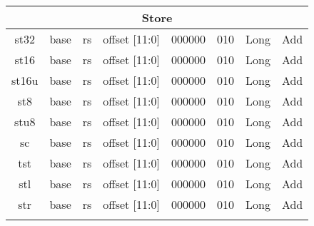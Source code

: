 \documentclass{article}
\begin{document}
\begin{center}
\begin{longtable}{|c|l|r|l|r|l|r|l|r|l|r|c|c|}
                        \multicolumn{13}{|c|}{Store} \\
    \hline st32     &   \multicolumn{2}{|c|}{base}  &   \multicolumn{2}{|c|}{rs}    &   \multicolumn{2}{|c|}{offset [11:0]} &   \multicolumn{2}{|c|}{000000}    &   \multicolumn{2}{|c|}{010}   &   Long    &   Add \\
    \hline st16     &   \multicolumn{2}{|c|}{base}  &   \multicolumn{2}{|c|}{rs}    &   \multicolumn{2}{|c|}{offset [11:0]} &   \multicolumn{2}{|c|}{000000}    &   \multicolumn{2}{|c|}{010}   &   Long    &   Add \\
    \hline st16u    &   \multicolumn{2}{|c|}{base}  &   \multicolumn{2}{|c|}{rs}    &   \multicolumn{2}{|c|}{offset [11:0]} &   \multicolumn{2}{|c|}{000000}    &   \multicolumn{2}{|c|}{010}   &   Long    &   Add \\
    \hline st8      &   \multicolumn{2}{|c|}{base}  &   \multicolumn{2}{|c|}{rs}    &   \multicolumn{2}{|c|}{offset [11:0]} &   \multicolumn{2}{|c|}{000000}    &   \multicolumn{2}{|c|}{010}   &   Long    &   Add \\
    \hline stu8     &   \multicolumn{2}{|c|}{base}  &   \multicolumn{2}{|c|}{rs}    &   \multicolumn{2}{|c|}{offset [11:0]} &   \multicolumn{2}{|c|}{000000}    &   \multicolumn{2}{|c|}{010}   &   Long    &   Add \\
    \hline sc       &   \multicolumn{2}{|c|}{base}  &   \multicolumn{2}{|c|}{rs}    &   \multicolumn{2}{|c|}{offset [11:0]} &   \multicolumn{2}{|c|}{000000}    &   \multicolumn{2}{|c|}{010}   &   Long    &   Add \\  
    \hline tst      &   \multicolumn{2}{|c|}{base}  &   \multicolumn{2}{|c|}{rs}    &   \multicolumn{2}{|c|}{offset [11:0]} &   \multicolumn{2}{|c|}{000000}    &   \multicolumn{2}{|c|}{010}   &   Long    &   Add \\
    \hline stl      &   \multicolumn{2}{|c|}{base}  &   \multicolumn{2}{|c|}{rs}    &   \multicolumn{2}{|c|}{offset [11:0]} &   \multicolumn{2}{|c|}{000000}    &   \multicolumn{2}{|c|}{010}   &   Long    &   Add \\
    \hline str      &   \multicolumn{2}{|c|}{base}  &   \multicolumn{2}{|c|}{rs}    &   \multicolumn{2}{|c|}{offset [11:0]} &   \multicolumn{2}{|c|}{000000}    &   \multicolumn{2}{|c|}{010}   &   Long    &   Add \\
    
    
    \hline              \multicolumn{13}{|c|}{} \\
    

\end{longtable}
\end{center}
\end{document}
